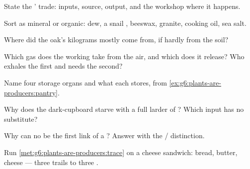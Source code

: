 \begin{exercise}[$\star$]\label{exo:g6:plants-are-producers:2}
State the ' trade: inputs,  source, output,
and the workshop where it happens.
\end{exercise}

\begin{exercise}[$\star$]\label{exo:g6:plants-are-producers:3}
Sort as mineral or organic: dew, a snail , beeswax,
granite, cooking oil, sea salt.
\end{exercise}

\begin{exercise}[$\star$]\label{exo:g6:plants-are-producers:4}
Where did the oak's kilograms mostly come from, if hardly
from the soil?
\end{exercise}

\begin{exercise}[$\star$]\label{exo:g6:plants-are-producers:5}
Which gas does the working  take from the air, and
which does it release? Who exhales the first and needs the
second?
\end{exercise}

\begin{exercise}[$\star$]\label{exo:g6:plants-are-producers:6}
Name four  storage organs and what each stores, from
\cref{ex:g6:plants-are-producers:pantry}.
\end{exercise}

\begin{exercise}[$\star\star$]\label{exo:g6:plants-are-producers:7}
Why does the dark-cupboard  starve with a full larder
of ? Which input has no substitute?
\end{exercise}

\begin{exercise}[$\star\star$]\label{exo:g6:plants-are-producers:8}
Why can no  be the first link of a ?
Answer with the / distinction.
\end{exercise}

\begin{exercise}[$\star\star$]\label{exo:g6:plants-are-producers:9}
Run \cref{met:g6:plants-are-producers:trace} on a cheese
sandwich: bread, butter, cheese --- three trails to three
.
\end{exercise}

